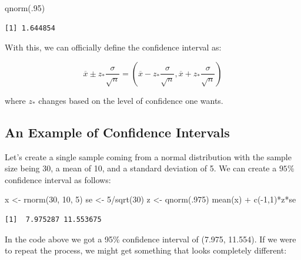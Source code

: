 \documentclass[
  letterpaper,
  DIV=11,
  numbers=noendperiod]{scrreprt}
\newenvironment{Shaded}{\begin{snugshade}}{\end{snugshade}}
\newcommand{\DecValTok}[1]{\textcolor[rgb]{0.68,0.00,0.00}{#1}}
\newcommand{\FunctionTok}[1]{\textcolor[rgb]{0.28,0.35,0.67}{#1}}
\newcommand{\NormalTok}[1]{\textcolor[rgb]{0.00,0.23,0.31}{#1}}
\newcommand{\OtherTok}[1]{\textcolor[rgb]{0.00,0.23,0.31}{#1}}
\newcommand{\SpecialCharTok}[1]{\textcolor[rgb]{0.37,0.37,0.37}{#1}}
\begin{document}
\begin{Shaded}
\begin{Highlighting}[]
\FunctionTok{qnorm}\NormalTok{(.}\DecValTok{95}\NormalTok{)}
\end{Highlighting}
\end{Shaded}

\begin{verbatim}
[1] 1.644854
\end{verbatim}

With this, we can officially define the confidence interval as:

\[ \overline{x} \pm z_{*} \frac{\sigma}{\sqrt{n}} = \left(\overline{x} -  z_{*} \frac{\sigma}{\sqrt{n}} ,\overline{x} +  z_{*} \frac{\sigma}{\sqrt{n}} \right) \]

where \(z_*\) changes based on the level of confidence one wants.

\subsection{An Example of Confidence
Intervals}\label{an-example-of-confidence-intervals}

Let's create a single sample coming from a normal distribution with the
sample size being 30, a mean of 10, and a standard deviation of 5. We
can create a \(95\%\) confidence interval as follows:

\begin{Shaded}
\begin{Highlighting}[]
\NormalTok{x }\OtherTok{\textless{}{-}} \FunctionTok{rnorm}\NormalTok{(}\DecValTok{30}\NormalTok{, }\DecValTok{10}\NormalTok{, }\DecValTok{5}\NormalTok{)}
\NormalTok{se }\OtherTok{\textless{}{-}} \DecValTok{5}\SpecialCharTok{/}\FunctionTok{sqrt}\NormalTok{(}\DecValTok{30}\NormalTok{)}
\NormalTok{z }\OtherTok{\textless{}{-}} \FunctionTok{qnorm}\NormalTok{(.}\DecValTok{975}\NormalTok{)}
\FunctionTok{mean}\NormalTok{(x) }\SpecialCharTok{+} \FunctionTok{c}\NormalTok{(}\SpecialCharTok{{-}}\DecValTok{1}\NormalTok{,}\DecValTok{1}\NormalTok{)}\SpecialCharTok{*}\NormalTok{z}\SpecialCharTok{*}\NormalTok{se}
\end{Highlighting}
\end{Shaded}

\begin{verbatim}
[1]  7.975287 11.553675
\end{verbatim}

In the code above we got a 95\% confidence interval of (7.975, 11.554).
If we were to repeat the process, we might get something that looks
completely different:
\end{document}
